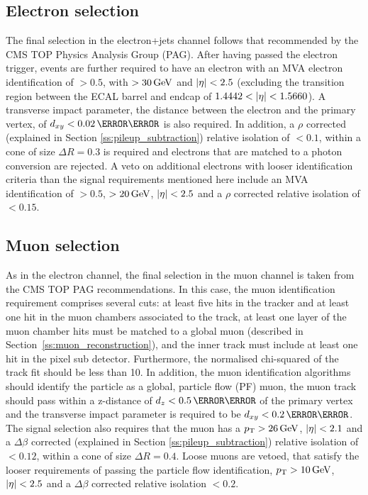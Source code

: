\subsection{Electron selection}
\label{electronplusjetschannelselection}
The final selection in the electron+jets channel follows that recommended by the CMS TOP Physics Analysis
Group (PAG). After having passed the electron trigger, events are further required to have an electron with an
MVA electron identification of $>0.5$, with \Et $> 30\,\text{Ge\hspace{-.08em}V}$ and $|\eta| < 2.5$ (excluding the transition
region between the ECAL barrel and endcap of $1.4442 < |\eta| < 1.5660$). A transverse impact parameter, the
distance between the electron and the primary vertex, of $d_{xy} < 0.02\cm$ is also required. In addition, a
$\rho$ corrected (explained in Section \ref{ss:pileup_subtraction}) relative isolation of $< 0.1$, within a
cone of size $\Delta R = 0.3$ is required and electrons that are matched to a photon conversion are rejected.
A veto on additional electrons with looser identification criteria than the signal requirements mentioned here
include an MVA identification of $> 0.5$, \Et $> 20\,\text{Ge\hspace{-.08em}V}$, $|\eta| < 2.5$ and a $\rho$ corrected relative
isolation of $<0.15$.

\subsection{Muon selection}
\label{muonplusjetschannelselection}
As in the electron channel, the final selection in the muon channel is taken from the CMS TOP PAG
recommendations. In this case, the muon identification requirement comprises several cuts: at least five hits
in the tracker and at least one hit in the muon chambers associated to the track, at least one layer of the
muon chamber hits must be matched to a global muon (described in Section~\ref{ss:muon_reconstruction}), and
the inner track must include at least one hit in the pixel sub detector. Furthermore, the normalised
chi-squared of the track fit should be less than 10. In addition, the muon identification algorithms should
identify the particle as a global, particle flow (PF) muon, the muon track should pass within a z-distance of
$d_{z} < 0.5\cm$ of the primary vertex and the transverse impact parameter is required to be $d_{xy} <
0.2\cm$. The signal selection also requires that the muon has a $p_{\mathrm{T}} > 26\,\text{Ge\hspace{-.08em}V}$, $|\eta| < 2.1$ and a
$\Delta\beta$ corrected (explained in Section \ref{ss:pileup_subtraction}) relative isolation of $< 0.12$,
within a cone of size $\Delta R = 0.4$. Loose muons are vetoed, that satisfy the looser requirements of
passing the particle flow identification, $p_{\mathrm{T}} > 10\,\text{Ge\hspace{-.08em}V}$, $|\eta| < 2.5$ and a $\Delta\beta$ corrected
relative isolation $<0.2$.

